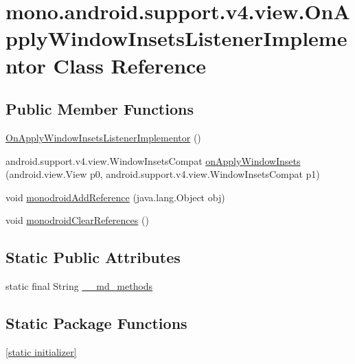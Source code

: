 \hypertarget{classmono_1_1android_1_1support_1_1v4_1_1view_1_1_on_apply_window_insets_listener_implementor}{
\section{mono.android.support.v4.view.OnApplyWindowInsetsListenerImplementor Class Reference}
\label{classmono_1_1android_1_1support_1_1v4_1_1view_1_1_on_apply_window_insets_listener_implementor}
}
\subsection*{Public Member Functions}
\begin{CompactItemize}
\item 
\hyperlink{classmono_1_1android_1_1support_1_1v4_1_1view_1_1_on_apply_window_insets_listener_implementor_416a721655e71bb15fa0f7db52314cfd}{OnApplyWindowInsetsListenerImplementor} ()
\item 
android.support.v4.view.WindowInsetsCompat \hyperlink{classmono_1_1android_1_1support_1_1v4_1_1view_1_1_on_apply_window_insets_listener_implementor_2230411e95dcf2d47b86e1b35d2e91ee}{onApplyWindowInsets} (android.view.View p0, android.support.v4.view.WindowInsetsCompat p1)
\item 
void \hyperlink{classmono_1_1android_1_1support_1_1v4_1_1view_1_1_on_apply_window_insets_listener_implementor_1cc958285db59d60fb6eac2b1f8295ec}{monodroidAddReference} (java.lang.Object obj)
\item 
void \hyperlink{classmono_1_1android_1_1support_1_1v4_1_1view_1_1_on_apply_window_insets_listener_implementor_c798280f8de141aa346f20a7cee58899}{monodroidClearReferences} ()
\end{CompactItemize}
\subsection*{Static Public Attributes}
\begin{CompactItemize}
\item 
static final String \hyperlink{classmono_1_1android_1_1support_1_1v4_1_1view_1_1_on_apply_window_insets_listener_implementor_9d2e89b4e2dcf4aea44200c6427f14a4}{\_\-\_\-md\_\-methods}
\end{CompactItemize}
\subsection*{Static Package Functions}
\begin{CompactItemize}
\item 
\hyperlink{classmono_1_1android_1_1support_1_1v4_1_1view_1_1_on_apply_window_insets_listener_implementor_9ca7294f6fda9919aeb93096889bb4a5}{\mbox{[}static initializer\mbox{]}}
\end{CompactItemize}
